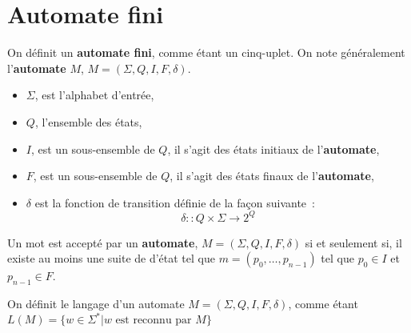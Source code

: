 \section{Automate fini}

\begin{Definition}
  On définit un \textbf{automate fini}, comme étant un cinq-uplet. On note 
  généralement l'\textbf{automate} \(M\), \(M = (\Sigma, Q, I, F, \delta)\).
  \begin{itemize}
    \item \(\Sigma\), est l'alphabet d'entrée,
    \item \(Q\), l'ensemble des états,
    \item \(I\), est un sous-ensemble de \(Q\), il s'agit des états initiaux de 
    l'\textbf{automate},
    \item \(F\), est un sous-ensemble de \(Q\), il s'agit des états finaux de 
    l'\textbf{automate},
    \item \(\delta\) est la fonction de transition définie de la façon 
    suivante~:
    \[
      \delta :: Q \times \Sigma \to 2^Q
    \]
  \end{itemize}
\end{Definition}

\begin{Definition}
  Un mot est accepté par un \textbf{automate}, \(M = (\Sigma, Q, I, F, \delta)\) 
  si et seulement si, il existe au moins une suite de d'état tel que 
  \(m = (p_0, \dots, p_{n-1})\) tel que \(p_0 \in I\) et \(p_{n-1} \in F\).
\end{Definition}

\begin{Definition}
  On définit le langage d'un automate \(M = (\Sigma, Q, I, F, \delta)\), comme 
  étant \(L(M) = \{w \in \Sigma^* | w \text{ est reconnu par } M\}\)
\end{Definition}

\begin{Definition}
  
\end{Definition}
